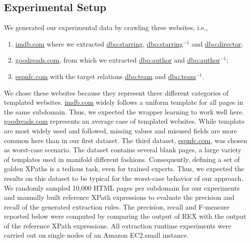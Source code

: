 \documentclass{llncs}
\begin{document}
\subsection{Experimental Setup}
We generated our experimental data by crawling three websites, i.e., 
\begin{enumerate}
\item \url{imdb.com} where we extracted \url{dbo:starring}, \url{dbo:starring}$^{-1}$ and \url{dbo:director};
\item \url{goodreads.com}, from which we extracted \url{dbo:author} and \url{dbo:author}$^{-1}$;
\item \url{espnfc.com} with the target relations \url{dbo:team} and \url{dbo:team}$^{-1}$.
\end{enumerate}
We chose these websites because they represent three different categories of templated websites.
\url{imdb.com} widely follows a uniform template for all pages in the same subdomain.
Thus, we expected the wrapper learning  to work well here.
\url{goodreads.com} represents an average case of templated websites. 
While template are most widely used and followed, missing values and misused fields are more common here than in our first dataset.
The third dataset, \url{espnfc.com}, was chosen as worst-case scenario.
The dataset contains several blank pages, a large variety of  templates used in manifold different fashions.
Consequently, defining a set of golden XPaths is a tedious task, even for trained experts.
Thus, we expected the results on this dataset to be typical for the worst-case behavior of our approach.
We randomly sampled 10,000 HTML pages per subdomain for our experiments and manually built reference XPath expressions to evaluate the precision and recall of the generated extraction rules. 
The precision, recall and F-measure reported below were computed by comparing the output of REX with the output of the reference XPath expressions.
All extraction runtime experiments were carried out on single nodes of an Amazon EC2.small instance.

\end{document}
